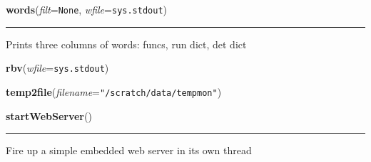     \vspace{0.5ex}

    \begin{boxedminipage}{\textwidth}

    \raggedright \textbf{words}(\textit{filt}=\texttt{None}, \textit{wfile}=\texttt{sys.stdout})

    \vspace{-1.5ex}

    \rule{\textwidth}{0.5\fboxrule}
    Prints three columns of words: funcs, run dict, det dict

    \vspace{1ex}

    \end{boxedminipage}

    \label{words:rbv}

    \vspace{0.5ex}

    \begin{boxedminipage}{\textwidth}

    \raggedright \textbf{rbv}(\textit{wfile}=\texttt{sys.stdout})

    \end{boxedminipage}

    \label{words:temp2file}

    \vspace{0.5ex}

    \begin{boxedminipage}{\textwidth}

    \raggedright \textbf{temp2file}(\textit{filename}=\texttt{"/scratch/data/tempmon"})

    \end{boxedminipage}

    \label{words:startWebServer}

    \vspace{0.5ex}

    \begin{boxedminipage}{\textwidth}

    \raggedright \textbf{startWebServer}()

    \vspace{-1.5ex}

    \rule{\textwidth}{0.5\fboxrule}
    Fire up a simple embedded web server in its own thread

    \vspace{1ex}

    \end{boxedminipage}

